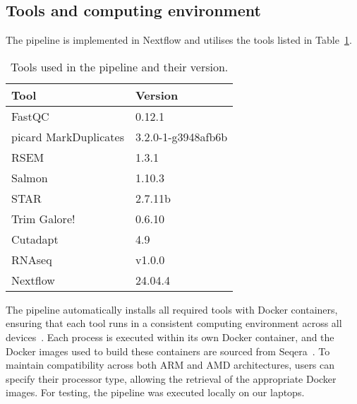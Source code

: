 \documentclass[12pt]{article}
\begin{document}
\subsection{Tools and computing environment}
The pipeline is implemented in Nextflow and utilises the tools listed in Table~\ref{table:1}.
\begin{table}[h]
    \centering
    \caption{Tools used in the pipeline and their version.}
    \label{table:1}
    \begin{tabular}{@{}lp{4cm}@{}}
        \toprule
        \textbf{Tool} & \textbf{Version} \\ \midrule
        FastQC & 0.12.1\\
        picard MarkDuplicates & 3.2.0-1-g3948afb6b\\
        RSEM & 1.3.1\\
        Salmon & 1.10.3\\
        STAR & 2.7.11b\\
        Trim Galore! & 0.6.10\\
        Cutadapt & 4.9\\
        RNAseq & v1.0.0\\
        Nextflow & 24.04.4\\
        \hline
    \end{tabular}
\end{table}
The pipeline automatically installs all required tools with Docker containers, ensuring that each tool runs in a consistent computing environment across all devices~\cite{docker}. Each process is executed within its own Docker container, and the Docker images used to build these containers are sourced from Seqera~\cite{seqera}. To maintain compatibility across both ARM and AMD architectures, users can specify their processor type, allowing the retrieval of the appropriate Docker images.
For testing, the pipeline was executed locally on our laptops.
\end{document}
